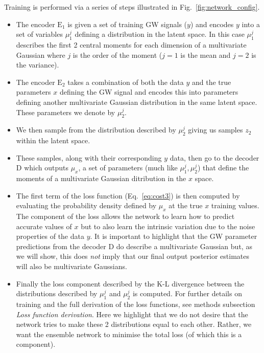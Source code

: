 \documentclass[%
showpacs,
 amsmath,amssymb,
 aps,
 twocolumn,
 prl,
 reprint,
floatfix,
]{revtex4-1}
\begin{document}
%
%
Training is performed via a series of steps illustrated in
Fig.~\ref{fig:network_config}. 
%
\begin{itemize}
%
\item The encoder $\textrm{E}_1$ is given a set of training \ac{GW} signals
($y$) and encodes $y$ into a set of variables $\mu^{j}_{1}$ defining a
distribution in the latent space. In this case $\mu^{j}_{1}$ describes the
first 2 central moments for each dimension of a multivariate Gaussian where $j$
is the order of the moment ($j=1$ is the mean and $j=2$ is the variance). 
%
\item The encoder $\textrm{E}_2$ takes a combination of both the data $y$ and
the true parameters $x$ defining the \ac{GW} signal and encodes this into
parameters defining another multivariate Gaussian distribution in the same
latent space. These parameters we denote by $\mu^{j}_{2}$.
%
\item We then sample from the distribution described by $\mu^{j}_{2}$
giving us samples $z_{2}$ within the latent space. 
%
\item These samples, along with their corresponding $y$ data, then go to the
decoder D which outputs $\mu_{x}$, a set of parameters (much like
$\mu^{j}_{1},\mu^{j}_{2}$) that define the moments of a multivariate Gaussian
ditribution in the $x$ space.
\item The first term of the loss function (Eq.~\ref{eq:cost3}) is then computed
by evaluating the probability density defined by $\mu_x$ at the true $x$
training values. The component of the loss allows the network to learn how to
predict accurate values of $x$ but to also learn the intrinsic variation due to
the noise properties of the data $y$. It is important to highlight that the
\ac{GW} parameter predictions from the decoder D do describe a multivariate
Gaussian but, as we will show, this does \emph{not} imply that our final output
posterior estimates will also be multivariate Gaussians.
%
\item Finally the loss component described by the K-L divergence between the
distributions described by $\mu^{j}_1$ and $\mu^{j}_2$ is computed. For further
details on training and the full derivation of the loss functions, see methods
subsection \textit{Loss function derivation}. Here we highlight that we do not
desire that the network tries to make these 2 distributions equal to each
other. Rather, we want the ensemble network to minimise the total loss (of
which this is a component).  
%
\end{itemize}
\end{document}
